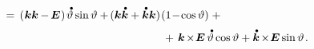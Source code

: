 \begin{otherlanguage}{russian}
\[\begin{array}{r@{\hspace{.33em}}c@{\hspace{.25em}}l}
\\[0.4em]
%
& = & \hspace{.2em} \tikzmark{StartBraceDotPs} {\left( \hspace{.1ex} \bm{k} \bm{k} \hspace{-0.1ex} - \hspace{-0.2ex} \UnitDyad \hspace{.1ex} \right) \hspace{-0.1ex} \mathdotabove{\vartheta} \operatorname{sin} \vartheta + \hspace{-0.2ex} ( \bm{k} \mathdotabove{\bm{k}} + \mathdotabove{\bm{k}} \bm{k} ) \hspace{-0.2ex} \left({1 \!-\! \operatorname{cos} \vartheta}\right)} \tikzmark{EndBraceDotPs} \hspace{.64ex} + \\[0.64em]
& & \hspace{13.2em} + \hspace{.72ex} \tikzmark{StartBraceDotPa} {\hspace{.12ex} \bm{k} \hspace{-0.24ex}\times\hspace{-0.4ex} \UnitDyad \hspace{.4ex} \mathdotabove{\vartheta} \operatorname{cos} \vartheta + \mathdotabove{\bm{k}} \hspace{-0.24ex}\times\hspace{-0.4ex} \UnitDyad \operatorname{sin} \vartheta} \tikzmark{EndBraceDotPa}
\hspace{.1em} .
\end{array}\]%
\vspace{-1.2em}



\end{otherlanguage}
